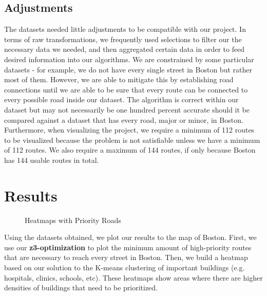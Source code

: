 \documentclass[15pt]{report}
\begin{document}
\subsection*{Adjustments}
The datasets needed little adjustments to be compatible with our project. In terms of raw transformations, we frequently used selections to filter our the necessary data we needed, and then aggregated certain data in order to feed desired information into our algorithms. We are constrained by some particular datasets - for example, we do not have every single street in Boston but rather most of them. However, we are able to mitigate this by establishing road connections until we are able to be sure that every route can be connected to every possible road inside our dataset. The algorithm is correct within our dataset but may not necessarily be one hundred percent accurate should it be compared against a dataset that has every road, major or minor, in Boston. Furthermore, when visualizing the project, we require a minimum of 112 routes to be visualized because the problem is not satisfiable unless we have a minimum of 112 routes. We also require a maximum of 144 routes, if only because Boston has 144 usable routes in total. 

\section*{Results}
\begin{figure}[h!]
	\centering
	\caption{Heatmaps with Priority Roads}
	\label{fig:method}
\end{figure} 
\noindent Using the datasets obtained, we plot our results to the map of Boston. First, we use our \textbf{z3-optimization} to plot the minimum amount of high-priority routes that are necessary to reach every street in Boston. Then, we build a heatmap based on our solution to the K-means clustering of important buildings (e.g. hospitals, clinics, schools, etc). These heatmaps show areas where there are higher densities of buildings that need to be prioritized.
\end{document}
